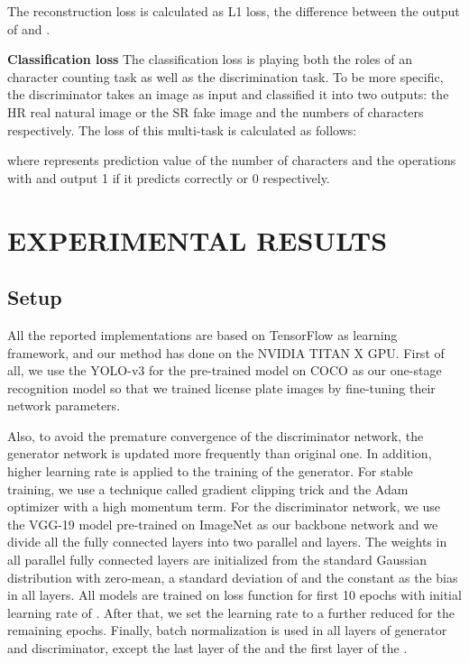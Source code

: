 \documentclass[a4paper,twoside]{article}
\begin{document}
    The reconstruction loss is calculated as L1 loss, the difference between the output of  and .
    
    \textbf{Classification loss} The classification loss is playing both the roles of an character counting task as well as the discrimination task. To be more specific, the discriminator takes an image as input and classified it into two outputs: the HR real natural image or the SR fake image and the numbers of characters respectively. The loss of this multi-task is calculated as follows:

    where  represents prediction value of the number of characters and the operations  with  and  output 1 if it predicts correctly or 0 respectively.

\section{\uppercase{Experimental results}}

\subsection{Setup}
     All the reported implementations are based on TensorFlow as learning framework, and our method has done on the NVIDIA TITAN X GPU. First of all, we use the YOLO-v3 for the pre-trained model on COCO \cite{lin2014microsoft} as our one-stage recognition model so that we trained license plate images by fine-tuning their network parameters. 
     
     Also, to avoid the premature convergence of the discriminator network, the generator network is updated more frequently than original one. In addition, higher learning rate is applied to the training of the generator. For stable training, we use a technique called gradient clipping trick \cite{pascanu2013difficulty} and the Adam optimizer \cite{kingma2014adam} with a high momentum term. For the discriminator network, we use the VGG-19 \cite{simonyan2014very} model pre-trained on ImageNet as our backbone network and we divide all the fully connected layers into two parallel  and  layers. The weights in all parallel fully connected layers are initialized from the standard Gaussian distribution with zero-mean, a standard deviation of  and the constant  as the bias in all layers. All models are trained on loss function for first 10 epochs with initial learning rate of . After that, we set the learning rate to a further reduced  for the remaining epochs. Finally, batch normalization \cite{ioffe2015batch} is used in all layers of generator and discriminator, except the last layer of the  and the first layer of the . 
\end{document}
